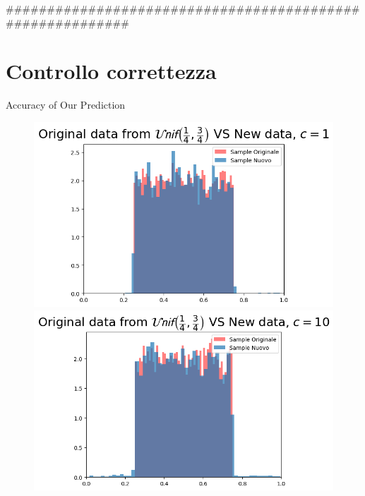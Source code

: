 \documentclass{beamer}
\begin{document}
##########################################################

\section{Controllo correttezza}
\begin{frame}{Accuracy of Our Prediction}
        \centering
    \begin{figure}
        \begin{minipage}{0.32\textwidth}
            \centering
            \includegraphics[width=\textwidth]{Predc1.png}
        \end{minipage}
        \hfill
        \begin{minipage}{0.32\textwidth}
            \centering
            \includegraphics[width=\textwidth]{Predc10.png}
        \end{minipage}
        \hfill
        \begin{minipage}{0.32\textwidth}
            \centering

\end{minipage}
\end{figure}
\end{frame}
\end{document}
